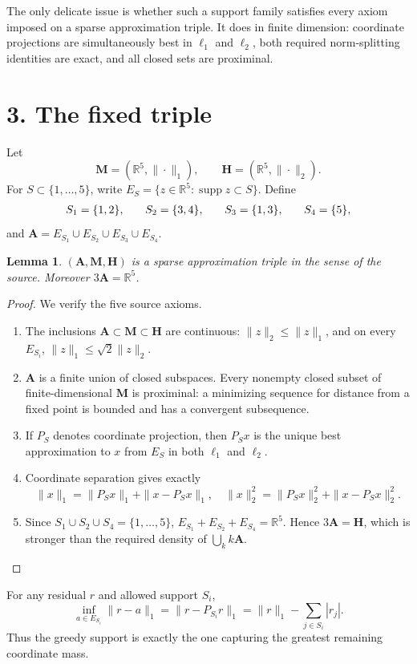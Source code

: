 \documentclass[10pt]{article}
\newtheorem{lemma}{Lemma}
\newcommand{\R}{\mathbb R}
\newcommand{\A}{\mathbf A}
\newcommand{\M}{\mathbf M}
\newcommand{\Hh}{\mathbf H}
\newcommand{\supp}{\operatorname{supp}}
\begin{document}
The only delicate issue is whether such a support family satisfies every
axiom imposed on a sparse approximation triple.  It does in finite
dimension: coordinate projections are simultaneously best in $\ell_1$ and
$\ell_2$, both required norm-splitting identities are exact, and all closed
sets are proximinal.

\section*{3. The fixed triple}

Let
\[
 \M=(\R^5,\|\cdot\|_1),\qquad
 \Hh=(\R^5,\|\cdot\|_2).
\]
For $S\subset\{1,\ldots,5\}$, write
$E_S=\{z\in\R^5:\supp z\subset S\}$.  Define
\[
 \begin{array}{c@{\qquad}c@{\qquad}c@{\qquad}c}
 S_1=\{1,2\},&S_2=\{3,4\},&S_3=\{1,3\},&S_4=\{5\},
 \end{array}
\]
and $\A=E_{S_1}\cup E_{S_2}\cup E_{S_3}\cup E_{S_4}$.

\begin{lemma}\label{lem:triple}
$(\A,\M,\Hh)$ is a sparse approximation triple in the sense of the source.
Moreover $3\A=\R^5$.
\end{lemma}

\begin{proof}
We verify the five source axioms.
\begin{enumerate}[label=(\roman*)]
\item The inclusions $\A\subset\M\subset\Hh$ are continuous:
$\|z\|_2\leq\|z\|_1$, and on every $E_{S_i}$,
$\|z\|_1\leq\sqrt2\|z\|_2$.
\item $\A$ is a finite union of closed subspaces.  Every nonempty closed
subset of finite-dimensional $\M$ is proximinal: a minimizing sequence for
distance from a fixed point is bounded and has a convergent subsequence.
\item If $P_S$ denotes coordinate projection, then $P_Sx$ is the unique
best approximation to $x$ from $E_S$ in both $\ell_1$ and $\ell_2$.
\item Coordinate separation gives exactly
\[
 \|x\|_1=\|P_Sx\|_1+\|x-P_Sx\|_1,
 \quad
 \|x\|_2^2=\|P_Sx\|_2^2+\|x-P_Sx\|_2^2.
\]
\item Since $S_1\cup S_2\cup S_4=\{1,\ldots,5\}$,
$E_{S_1}+E_{S_2}+E_{S_4}=\R^5$.  Hence $3\A=\Hh$, which is stronger than
the required density of $\bigcup_k k\A$.
\end{enumerate}
\end{proof}

For any residual $r$ and allowed support $S_i$,
\[
 \inf_{a\in E_{S_i}}\|r-a\|_1
 =\|r-P_{S_i}r\|_1
 =\|r\|_1-\sum_{j\in S_i}|r_j|.                        \tag{2}
\]
Thus the greedy support is exactly the one capturing the greatest remaining
coordinate mass.
\end{document}
